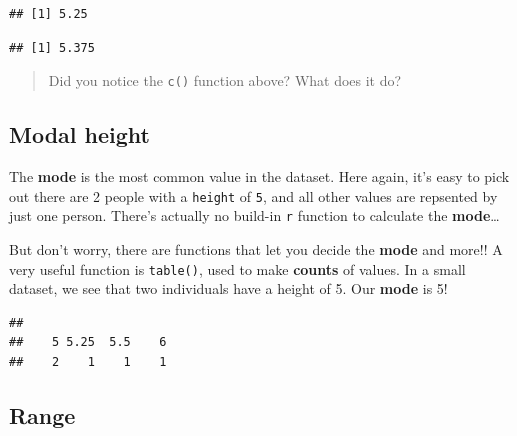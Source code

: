 \documentclass[
]{book}
\newenvironment{Shaded}{\begin{snugshade}}{\end{snugshade}}
\newcommand{\DocumentationTok}[1]{\textcolor[rgb]{0.56,0.35,0.01}{\textbf{\textit{#1}}}}
\newcommand{\FloatTok}[1]{\textcolor[rgb]{0.00,0.00,0.81}{#1}}
\newcommand{\FunctionTok}[1]{\textcolor[rgb]{0.13,0.29,0.53}{\textbf{#1}}}
\newcommand{\NormalTok}[1]{#1}
\newcommand{\SpecialCharTok}[1]{\textcolor[rgb]{0.81,0.36,0.00}{\textbf{#1}}}
\begin{document}
\begin{verbatim}
## [1] 5.25
\end{verbatim}

\begin{Shaded}
\end{Shaded}

\begin{verbatim}
## [1] 5.375
\end{verbatim}

\begin{quote}
Did you notice the \texttt{c()} function above? What does it do?
\end{quote}

\hypertarget{modal-height}{%
\subsection{Modal height}\label{modal-height}}

The \textbf{mode} is the most common value in the dataset. Here again, it's easy to pick out there are 2 people with a \texttt{height} of \texttt{5}, and all other values are repsented by just one person. There's actually no build-in \texttt{r} function to calculate the \textbf{mode}\ldots{}

But don't worry, there are functions that let you decide the \textbf{mode} and more!! A very useful function is \texttt{table()}, used to make \textbf{counts} of values. In a small dataset, we see that two individuals have a height of 5. Our \textbf{mode} is 5!

\begin{Shaded}
\end{Shaded}

\begin{verbatim}
## 
##    5 5.25  5.5    6 
##    2    1    1    1
\end{verbatim}

\hypertarget{range}{%
\subsection{Range}\label{range}}
\end{document}
